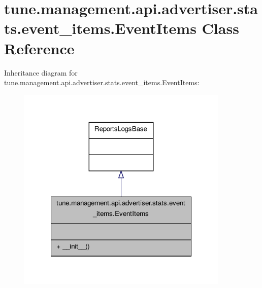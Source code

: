 \hypertarget{classtune_1_1management_1_1api_1_1advertiser_1_1stats_1_1event__items_1_1EventItems}{\section{tune.\-management.\-api.\-advertiser.\-stats.\-event\-\_\-items.\-Event\-Items Class Reference}
\label{classtune_1_1management_1_1api_1_1advertiser_1_1stats_1_1event__items_1_1EventItems}
}


Inheritance diagram for tune.\-management.\-api.\-advertiser.\-stats.\-event\-\_\-items.\-Event\-Items\-:
\nopagebreak
\begin{figure}[H]
\begin{center}
\leavevmode
\includegraphics[width=286pt]{classtune_1_1management_1_1api_1_1advertiser_1_1stats_1_1event__items_1_1EventItems__inherit__graph}
\end{center}
\end{figure}


